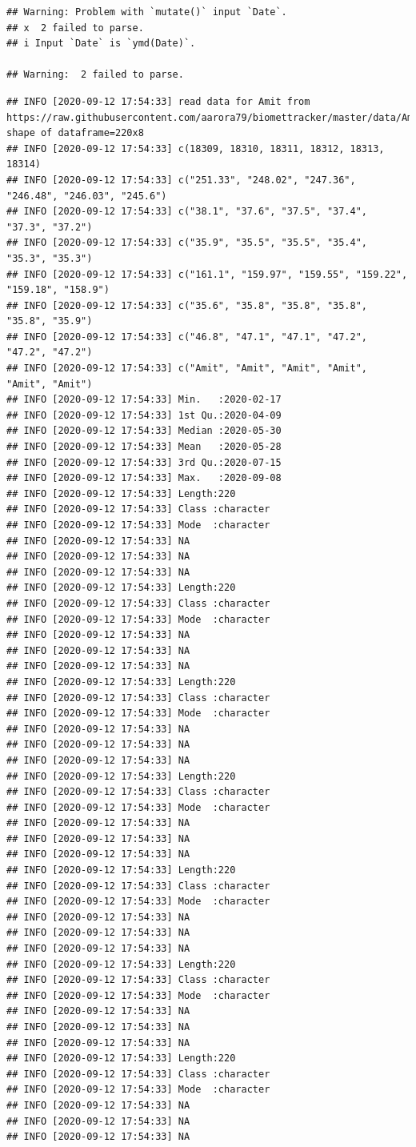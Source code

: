 \documentclass[oneside]{book}
\begin{document}
\begin{verbatim}
## Warning: Problem with `mutate()` input `Date`.
## x  2 failed to parse.
## i Input `Date` is `ymd(Date)`.

## Warning:  2 failed to parse.
\end{verbatim}

\begin{verbatim}
## INFO [2020-09-12 17:54:33] read data for Amit from https://raw.githubusercontent.com/aarora79/biomettracker/master/data/Amit.csv, shape of dataframe=220x8
## INFO [2020-09-12 17:54:33] c(18309, 18310, 18311, 18312, 18313, 18314)
## INFO [2020-09-12 17:54:33] c("251.33", "248.02", "247.36", "246.48", "246.03", "245.6")
## INFO [2020-09-12 17:54:33] c("38.1", "37.6", "37.5", "37.4", "37.3", "37.2")
## INFO [2020-09-12 17:54:33] c("35.9", "35.5", "35.5", "35.4", "35.3", "35.3")
## INFO [2020-09-12 17:54:33] c("161.1", "159.97", "159.55", "159.22", "159.18", "158.9")
## INFO [2020-09-12 17:54:33] c("35.6", "35.8", "35.8", "35.8", "35.8", "35.9")
## INFO [2020-09-12 17:54:33] c("46.8", "47.1", "47.1", "47.2", "47.2", "47.2")
## INFO [2020-09-12 17:54:33] c("Amit", "Amit", "Amit", "Amit", "Amit", "Amit")
## INFO [2020-09-12 17:54:33] Min.   :2020-02-17  
## INFO [2020-09-12 17:54:33] 1st Qu.:2020-04-09  
## INFO [2020-09-12 17:54:33] Median :2020-05-30  
## INFO [2020-09-12 17:54:33] Mean   :2020-05-28  
## INFO [2020-09-12 17:54:33] 3rd Qu.:2020-07-15  
## INFO [2020-09-12 17:54:33] Max.   :2020-09-08  
## INFO [2020-09-12 17:54:33] Length:220        
## INFO [2020-09-12 17:54:33] Class :character  
## INFO [2020-09-12 17:54:33] Mode  :character  
## INFO [2020-09-12 17:54:33] NA
## INFO [2020-09-12 17:54:33] NA
## INFO [2020-09-12 17:54:33] NA
## INFO [2020-09-12 17:54:33] Length:220        
## INFO [2020-09-12 17:54:33] Class :character  
## INFO [2020-09-12 17:54:33] Mode  :character  
## INFO [2020-09-12 17:54:33] NA
## INFO [2020-09-12 17:54:33] NA
## INFO [2020-09-12 17:54:33] NA
## INFO [2020-09-12 17:54:33] Length:220        
## INFO [2020-09-12 17:54:33] Class :character  
## INFO [2020-09-12 17:54:33] Mode  :character  
## INFO [2020-09-12 17:54:33] NA
## INFO [2020-09-12 17:54:33] NA
## INFO [2020-09-12 17:54:33] NA
## INFO [2020-09-12 17:54:33] Length:220        
## INFO [2020-09-12 17:54:33] Class :character  
## INFO [2020-09-12 17:54:33] Mode  :character  
## INFO [2020-09-12 17:54:33] NA
## INFO [2020-09-12 17:54:33] NA
## INFO [2020-09-12 17:54:33] NA
## INFO [2020-09-12 17:54:33] Length:220        
## INFO [2020-09-12 17:54:33] Class :character  
## INFO [2020-09-12 17:54:33] Mode  :character  
## INFO [2020-09-12 17:54:33] NA
## INFO [2020-09-12 17:54:33] NA
## INFO [2020-09-12 17:54:33] NA
## INFO [2020-09-12 17:54:33] Length:220        
## INFO [2020-09-12 17:54:33] Class :character  
## INFO [2020-09-12 17:54:33] Mode  :character  
## INFO [2020-09-12 17:54:33] NA
## INFO [2020-09-12 17:54:33] NA
## INFO [2020-09-12 17:54:33] NA
## INFO [2020-09-12 17:54:33] Length:220        
## INFO [2020-09-12 17:54:33] Class :character  
## INFO [2020-09-12 17:54:33] Mode  :character  
## INFO [2020-09-12 17:54:33] NA
## INFO [2020-09-12 17:54:33] NA
## INFO [2020-09-12 17:54:33] NA
\end{verbatim}
\end{document}
